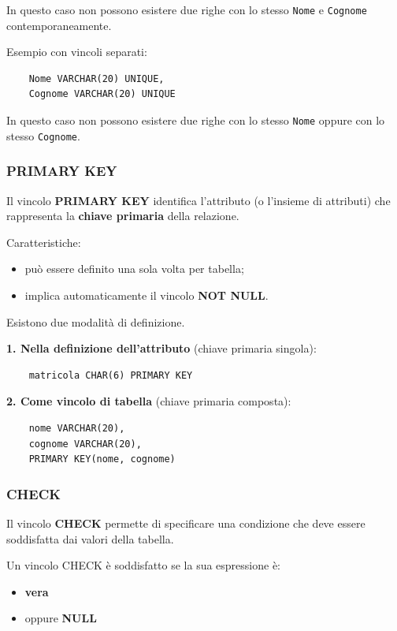 In questo caso non possono esistere due righe con lo stesso
\texttt{Nome} e \texttt{Cognome} contemporaneamente.

Esempio con vincoli separati:

\begin{verbatim}
	Nome VARCHAR(20) UNIQUE,
	Cognome VARCHAR(20) UNIQUE
\end{verbatim}

In questo caso non possono esistere due righe con lo stesso
\texttt{Nome} oppure con lo stesso \texttt{Cognome}.

\subsubsection*{PRIMARY KEY}

Il vincolo \textbf{PRIMARY KEY} identifica l'attributo (o l'insieme di attributi)
che rappresenta la \textbf{chiave primaria} della relazione.

Caratteristiche:

\begin{itemize}
	\item può essere definito una sola volta per tabella;
	\item implica automaticamente il vincolo \textbf{NOT NULL}.
\end{itemize}

Esistono due modalità di definizione.

\textbf{1. Nella definizione dell'attributo} (chiave primaria singola):

\begin{verbatim}
	matricola CHAR(6) PRIMARY KEY
\end{verbatim}

\textbf{2. Come vincolo di tabella} (chiave primaria composta):

\begin{verbatim}
	nome VARCHAR(20),
	cognome VARCHAR(20),
	PRIMARY KEY(nome, cognome)
\end{verbatim}

\subsubsection*{CHECK}

Il vincolo \textbf{CHECK} permette di specificare una condizione che
deve essere soddisfatta dai valori della tabella.

Un vincolo CHECK è soddisfatto se la sua espressione è:

\begin{itemize}
	\item \textbf{vera}
	\item oppure \textbf{NULL}
\end{itemize}

